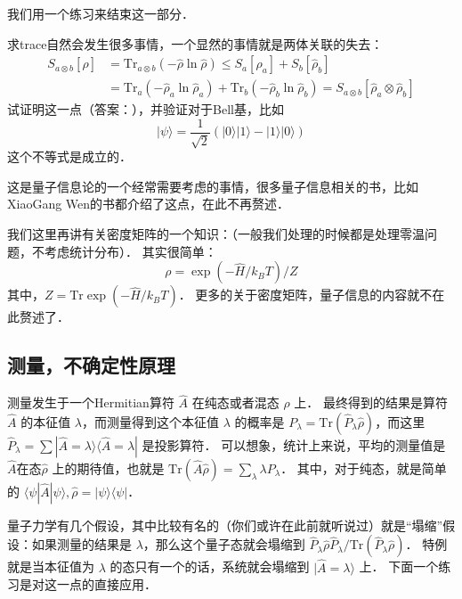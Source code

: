 我们用一个练习来结束这一部分．
\begin{exer}{}
求trace自然会发生很多事情，一个显然的事情就是两体关联的失去：
\begin{equation}
\begin{split}
S_{a\otimes b}[\hat\rho]&=\text{Tr}_{a\otimes b}(-\hat\rho\ln\hat\rho)\le S_a[\hat\rho_a]+S_b[\hat\rho_b]\\
&=\text{Tr}_a(-\hat\rho_a\ln\hat\rho_a)+\text{Tr}_b(-\hat\rho_b\ln\hat\rho_b)=S_{a\otimes b}[\hat\rho_a\otimes\hat\rho_b]
\end{split}
\end{equation}
试证明这一点（答案：\cite{trace}），并验证对于Bell基，比如
\begin{equation}
|\psi\rangle = \frac{1}{\sqrt{2}}(|0\rangle|1\rangle-|1\rangle|0\rangle)
\end{equation}
这个不等式是成立的．

这是量子信息论的一个经常需要考虑的事情，很多量子信息相关的书，比如XiaoGang Wen的书\cite{2015arXiv150802595Z}都介绍了这点，在此不再赘述．
\end{exer}

我们这里再讲有关密度矩阵的一个知识：（一般我们处理的时候都是处理零温问题，不考虑统计分布）． 其实很简单：
\begin{equation}
\rho=\exp(-\hat{H}/k_BT)/Z
\end{equation}
其中，$Z=\text{Tr}\exp(-\hat{H}/k_BT)$． 更多的关于密度矩阵，量子信息的内容就不在此赘述了．


\subsection{测量，不确定性原理}

测量发生于一个Hermitian算符 $\hat A$ 在纯态或者混态 $\hat\rho$ 上． 最终得到的结果是算符 $\hat A$ 的本征值 $\lambda$，而测量得到这个本征值 $\lambda$ 的概率是 $P_\lambda=\text{Tr}(\hat{P}_\lambda\hat\rho)$，而这里 $\hat P_\lambda=\sum|\hat{A}=\lambda\rangle\langle\hat{A}=\lambda|$ 是投影算符． 可以想象，统计上来说，平均的测量值是 $\hat A$在态$\hat\rho$ 上的期待值，也就是 $\text{Tr}(\hat A\hat\rho)=\sum_\lambda \lambda P_\lambda$． 其中，对于纯态，就是简单的 $\langle\psi|\hat A|\psi\rangle, \hat\rho=|\psi\rangle\langle\psi|$．

量子力学有几个假设，其中比较有名的（你们或许在此前就听说过）就是``塌缩''假设：如果测量的结果是 $\lambda$，那么这个量子态就会塌缩到 ${\hat P_\lambda\hat\rho\hat P_\lambda}/{\text{Tr}(\hat P_\lambda\hat\rho)}$． 特例就是当本征值为 $\lambda$ 的态只有一个的话，系统就会塌缩到 $|\hat{A}=\lambda\rangle$ 上． 下面一个练习是对这一点的直接应用．

